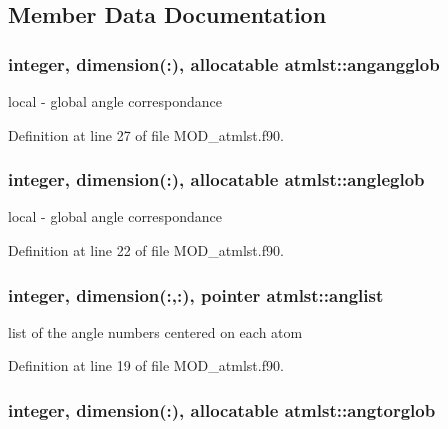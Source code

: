 \subsection{Member Data Documentation}
\hypertarget{classatmlst_a6cb31850632c949a1f23b9502ee85d9f}{
\subsubsection[{angangglob}]{\setlength{\rightskip}{0pt plus 5cm}integer, dimension(\-:), allocatable atmlst\-::angangglob}}\label{classatmlst_a6cb31850632c949a1f23b9502ee85d9f}


local -\/ global angle correspondance 



Definition at line 27 of file M\-O\-D\-\_\-atmlst.\-f90.

\hypertarget{classatmlst_a45a7db0334c1ba50359a2d19c05e9dbb}{
\subsubsection[{angleglob}]{\setlength{\rightskip}{0pt plus 5cm}integer, dimension(\-:), allocatable atmlst\-::angleglob}}\label{classatmlst_a45a7db0334c1ba50359a2d19c05e9dbb}


local -\/ global angle correspondance 



Definition at line 22 of file M\-O\-D\-\_\-atmlst.\-f90.

\hypertarget{classatmlst_ad232b9a788fe93379e9d80d30d8666ff}{
\subsubsection[{anglist}]{\setlength{\rightskip}{0pt plus 5cm}integer, dimension(\-:,\-:), pointer atmlst\-::anglist}}\label{classatmlst_ad232b9a788fe93379e9d80d30d8666ff}


list of the angle numbers centered on each atom 



Definition at line 19 of file M\-O\-D\-\_\-atmlst.\-f90.

\hypertarget{classatmlst_adb9f9daf04328071793845dfe16c57b6}{
\subsubsection[{angtorglob}]{\setlength{\rightskip}{0pt plus 5cm}integer, dimension(\-:), allocatable atmlst\-::angtorglob}}\label{classatmlst_adb9f9daf04328071793845dfe16c57b6}


